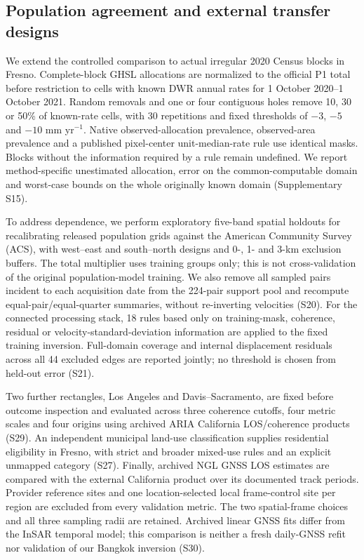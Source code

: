 \documentclass[pdflatex,sn-nature]{sn-jnl}
\begin{document}
\subsection{Population agreement and external transfer designs}
We extend the controlled comparison to actual irregular 2020 Census blocks in Fresno. Complete-block GHSL allocations are normalized to the official P1 total before restriction to cells with known DWR annual rates for 1 October 2020--1 October 2021. Random removals and one or four contiguous holes remove 10, 30 or 50\% of known-rate cells, with 30 repetitions and fixed thresholds of $-3$, $-5$ and $-10$ mm yr$^{-1}$. Native observed-allocation prevalence, observed-area prevalence and a published pixel-center unit-median-rate rule use identical masks. Blocks without the information required by a rule remain undefined. We report method-specific unestimated allocation, error on the common-computable domain and worst-case bounds on the whole originally known domain (Supplementary S15).

To address dependence, we perform exploratory five-band spatial holdouts for recalibrating released population grids against the American Community Survey (ACS), with west--east and south--north designs and 0-, 1- and 3-km exclusion buffers. The total multiplier uses training groups only; this is not cross-validation of the original population-model training. We also remove all sampled pairs incident to each acquisition date from the 224-pair support pool and recompute equal-pair/equal-quarter summaries, without re-inverting velocities (S20). For the connected processing stack, 18 rules based only on training-mask, coherence, residual or velocity-standard-deviation information are applied to the fixed training inversion. Full-domain coverage and internal displacement residuals across all 44 excluded edges are reported jointly; no threshold is chosen from held-out error (S21).

Two further rectangles, Los Angeles and Davis--Sacramento, are fixed before outcome inspection and evaluated across three coherence cutoffs, four metric scales and four origins using archived ARIA California LOS/coherence products \citep{sangha2026california,sangha2026data} (S29). An independent municipal land-use classification supplies residential eligibility in Fresno, with strict and broader mixed-use rules and an explicit unmapped category \citep{fresno2026landuse} (S27). Finally, archived NGL GNSS LOS estimates are compared with the external California product over its documented track periods. Provider reference sites and one location-selected local frame-control site per region are excluded from every validation metric. The two spatial-frame choices and all three sampling radii are retained. Archived linear GNSS fits differ from the InSAR temporal model; this comparison is neither a fresh daily-GNSS refit nor validation of our Bangkok inversion (S30).
\end{document}
